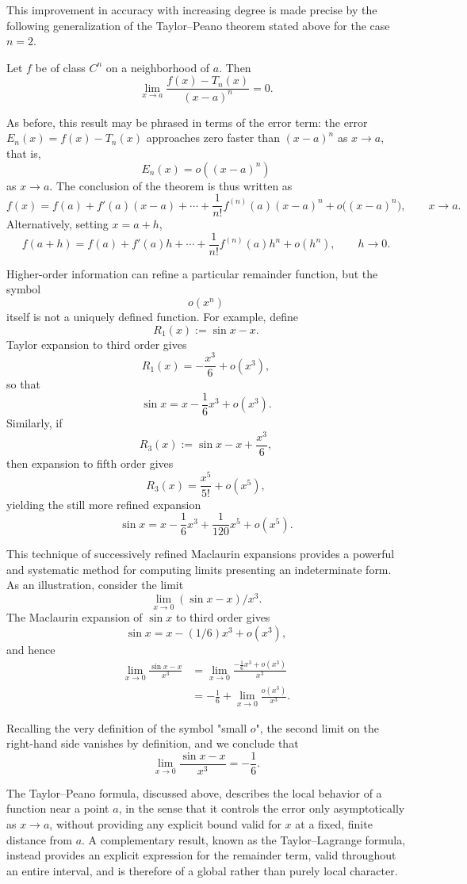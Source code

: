 This improvement in accuracy with increasing degree is made precise by the following generalization of the Taylor--Peano theorem stated above for the case $n=2$.

\begin{theorem}
Let $f$ be of class $C^n$ on a neighborhood of $a$. Then
\[
\lim_{x \to a} \frac{f(x) - T_n(x)}{(x-a)^n} = 0.
\]

\end{theorem}

As before, this result may be phrased in terms of the error term: the error $E_n(x) = f(x) - T_n(x)$ approaches zero faster than $(x-a)^n$ as $x \to a$, that is,
\[
E_n(x) = o((x-a)^n)
\]
 as $x \to a$. The conclusion of the theorem is thus written as
\[
f(x) = f(a) + f'(a)(x-a) + \cdots + \frac{1}{n!} f^{(n)}(a)(x-a)^n + o\big((x-a)^n\big), \qquad x \to a.
\]
Alternatively, setting $x = a + h$,
\[
f(a+h) = f(a) + f'(a) h + \cdots + \frac{1}{n!} f^{(n)}(a) h^n + o(h^n), \qquad h \to 0.
\]

Higher-order information can refine a particular remainder function, but
the symbol
\[
o(x^n)
\]
 itself is not a uniquely defined function. For example,
define
\[
R_1(x):=\sin x-x.
\]
Taylor expansion to third order gives
\[
R_1(x)=-\frac{x^3}{6}+o(x^3),
\]
so that
\[
\sin x = x - \frac{1}{6} x^3 + o(x^3).
\]
Similarly, if
\[
R_3(x):=\sin x-x+\frac{x^3}{6},
\]
then expansion to fifth order gives
\[
R_3(x)=\frac{x^5}{5!}+o(x^5),
\]
yielding the still more refined expansion
\[
\sin x = x - \frac{1}{6} x^3 + \frac{1}{120} x^5 + o(x^5).
\]

This technique of successively refined Maclaurin expansions provides a powerful and systematic method for computing limits presenting an indeterminate form. As an illustration, consider the limit
\[
\lim_{x \to 0} (\sin x - x)/x^3.
\]
The Maclaurin expansion of $\sin x$ to third order gives
\[
\sin x = x - (1/6) x^3 + o(x^3),
\]
and hence
\[
\begin{aligned}
\lim_{x \to 0} \frac{\sin x - x}{x^3} &= \lim_{x \to 0} \frac{-\frac{1}{6} x^3 + o(x^3)}{x^3} \\
&= -\frac{1}{6} + \lim_{x \to 0} \frac{o(x^3)}{x^3}.
\end{aligned}
\]

Recalling the very definition of the symbol "small $o$", the second limit on the right-hand side vanishes by definition, and we conclude that
\[
\lim_{x \to 0} \frac{\sin x - x}{x^3} = -\frac{1}{6}.
\]

The Taylor--Peano formula, discussed above, describes the local behavior of a function near a point $a$, in the sense that it controls the error only asymptotically as $x \to a$, without providing any explicit bound valid for $x$ at a fixed, finite distance from $a$. A complementary result, known as the Taylor--Lagrange formula, instead provides an explicit expression for the remainder term, valid throughout an entire interval, and is therefore of a global rather than purely local character.

